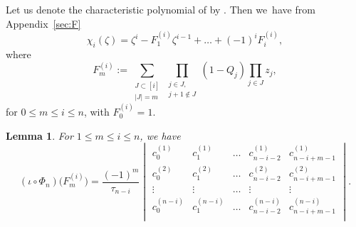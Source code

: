 \documentclass[pdftex]{sigma}
\numberwithin{equation}{section}
\newtheorem{Lemma}[Theorem]{Lemma}
\theoremstyle{definition}
\begin{document}
Let us denote
the characteristic polynomial of 
by
.
Then we~have from Appendix~\ref{sec:F}
\[
\chi_i(\zeta)=
\zeta^i-F^{(i)}_1\zeta^{i-1}+\dots+(-1)^{i}F^{(i)}_i,
\]
where
\begin{equation}
\label{eq:Fij}
F_m^{(i)}:=\sum_{\substack{J\subset [i]\\ |J|=m}}
\prod_{\substack{j\in J,\\j+1\notin J}}
(1-Q_j)\prod_{j\in J}z_j,
\end{equation}
for
$0\le m\le i\le n$, with $F_0^{(i)}=1$.

\begin{Lemma}\label{lem:SF_to_c}
For $1\le m\le i\le n$, we have
\[
(\iota\circ\Phi_n )\bigl(F^{(i)}_m\bigr)=\frac{(-1)^{m}}{\tau_{n-i}}
\begin{vmatrix}
c^{(1)}_{0} & c^{(1)}_{1} & \dots & c^{(1)}_{n-i-2}&c^{(1)}_{n-i+m-1}\\
c^{(2)}_{0} & c^{(2)}_{1} & \dots & c^{(2)}_{n-i-2}&c^{(2)}_{n-i+m-1}\\
\vdots & \vdots & \dots & \vdots &\vdots\\
c^{(n-i)}_{0} & c^{(n-i)}_{1} & \dots & c^{(n-i)}_{n-i-2}&c^{(n-i)}_{n-i+m-1}\\
\end{vmatrix}.
\]
\end{Lemma}
\end{document}
